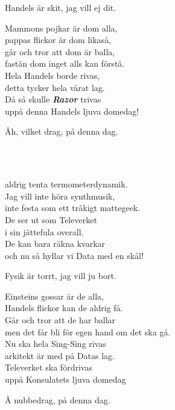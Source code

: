 {{\leftrepeat Handels är skit, jag vill ej dit. \rightrepeat

Mammons pojkar är dom alla,\\
pappas flickor är dom likaså,\\
går och tror att dom är balla,\\
fastän dom inget alls kan förstå.\\
Hela Handels borde rivas,\\
detta tycker hela vårat lag.\\
Då så skulle \textbf{\textit{Razor}} trivas\\
uppå denna Handels ljuva domedag!

\leftrepeat Åh, vilket drag, på denna dag. \rightrepeat


\newpage
 \\       

\\
aldrig tenta termometerdynamik.\\
Jag vill inte höra synthmusik,\\
inte festa som ett tråkigt mattegeek.\\ %
De ser ut som Televerket\\
i sin jättefula overall.\\
De kan bara räkna kvarkar\\
och nu så hyllar vi Data med en skål!

\leftrepeat Fysik är torrt, jag vill ju bort. \rightrepeat

Einsteins gossar är de alla,\\
Handels flickor kan de aldrig få.\\
Går och tror att de har ballar\\
men det får bli för egen hand om det ska gå.\\
Nu ska hela Sing-Sing rivas\\
arkitekt är med på Datas lag.\\
Televerket ska fördrivas\\
uppå Konsulatets ljuva domedag

\leftrepeat Å nubbedrag, på denna dag. \rightrepeat

 \\

}}
